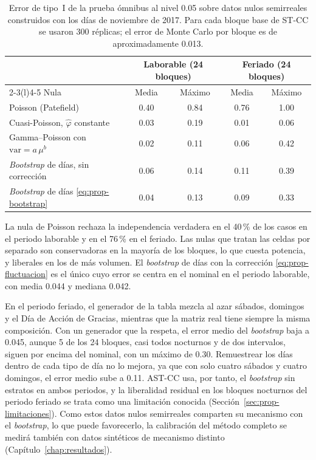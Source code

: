 \begin{table}[t]
\centering
\small
\begin{tabular}{@{}lcccc@{}}
\toprule
 & \multicolumn{2}{c}{Laborable (24 bloques)} & \multicolumn{2}{c}{Feriado (24 bloques)} \\
\cmidrule(lr){2-3}\cmidrule(l){4-5}
Nula & Media & Máximo & Media & Máximo \\
\midrule
Poisson (Patefield) & 0.40 & 0.84 & 0.76 & 1.00 \\
Cuasi-Poisson, $\hat\varphi$ constante & 0.03 & 0.19 & 0.01 & 0.06 \\
Gamma--Poisson con $\mathrm{var} = a\,\mu^b$ & 0.02 & 0.11 & 0.06 & 0.42 \\
\emph{Bootstrap} de días, sin corrección & 0.06 & 0.14 & 0.11 & 0.39 \\
\emph{Bootstrap} de días \eqref{eq:prop-bootstrap} & 0.04 & 0.13 & 0.09 & 0.33 \\
\bottomrule
\end{tabular}
\caption{Error de tipo~I de la prueba ómnibus al nivel 0.05 sobre datos nulos
semirreales construidos con los días de noviembre de 2017. Para cada bloque base
de ST-CC se usaron 300 réplicas; el error de Monte Carlo por bloque es de
aproximadamente 0.013.}
\label{tab:prop-calibracion}
\end{table}

La nula de Poisson rechaza la independencia verdadera en el 40\,\% de los casos
en el periodo laborable y en el 76\,\% en el feriado. Las nulas que tratan las
celdas por separado son conservadoras en la mayoría de los bloques, lo que cuesta
potencia, y liberales en los de más volumen. El \emph{bootstrap} de días con la
corrección \eqref{eq:prop-fluctuacion} es el único cuyo error se centra en el
nominal en el periodo laborable, con media 0.044 y mediana 0.042.

En el periodo feriado, el generador de la tabla mezcla al azar sábados, domingos
y el Día de Acción de Gracias, mientras que la matriz real tiene siempre la
misma composición. Con un generador que la respeta, el error medio del \emph{bootstrap}
baja a 0.045, aunque 5 de los 24 bloques, casi todos nocturnos y de dos
intervalos, siguen por encima del nominal, con un máximo de 0.30. Remuestrear los
días dentro de cada tipo de día no lo mejora, ya que con solo cuatro sábados y cuatro
domingos, el error medio sube a 0.11. AST-CC usa, por tanto, el \emph{bootstrap} sin
estratos en ambos periodos, y la liberalidad residual en los bloques nocturnos
del periodo feriado se trata como una limitación conocida
(Sección~\ref{sec:prop-limitaciones}). Como estos datos nulos semirreales
comparten su mecanismo con el \emph{bootstrap}, lo que puede favorecerlo, la
calibración del método completo se medirá también con datos sintéticos de
mecanismo distinto (Capítulo~\ref{chap:resultados}).

